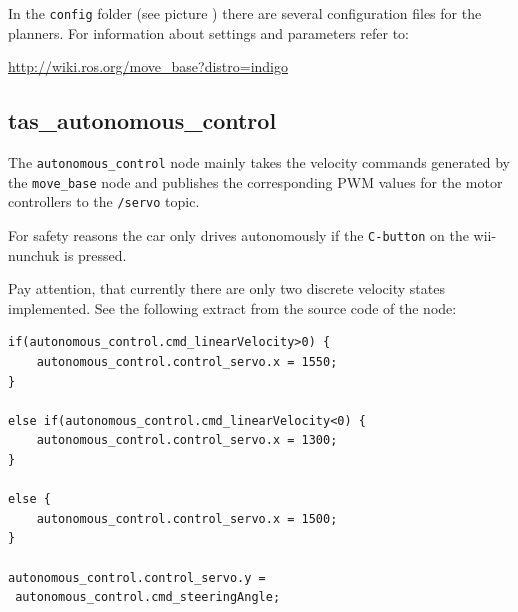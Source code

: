 In the \texttt{config} folder (see picture ) there are several configuration files for the planners. For information about settings and parameters refer to:

\hyperref[http://wiki.ros.org/move_base?distro=indigo]{http://wiki.ros.org/move\_base?distro=indigo}

\subsection{tas\_autonomous\_control}
\label{sec:tas_package_autonomous_control}
The  \texttt{autonomous\_control} node mainly takes the velocity commands generated by the \texttt{move\_base} node and publishes the corresponding PWM values for the motor controllers to the \texttt{/servo} topic.

For safety reasons the car only drives autonomously if the \texttt{C-button} on the wii-nunchuk is pressed.

Pay attention, that currently there are only two discrete velocity states implemented. See the following extract from the source code of the node:

\begin{lstlisting}
if(autonomous_control.cmd_linearVelocity>0) {
	autonomous_control.control_servo.x = 1550;
}

else if(autonomous_control.cmd_linearVelocity<0) {
	autonomous_control.control_servo.x = 1300;
}

else {
	autonomous_control.control_servo.x = 1500;
}

autonomous_control.control_servo.y = 
 autonomous_control.cmd_steeringAngle;
\end{lstlisting}











